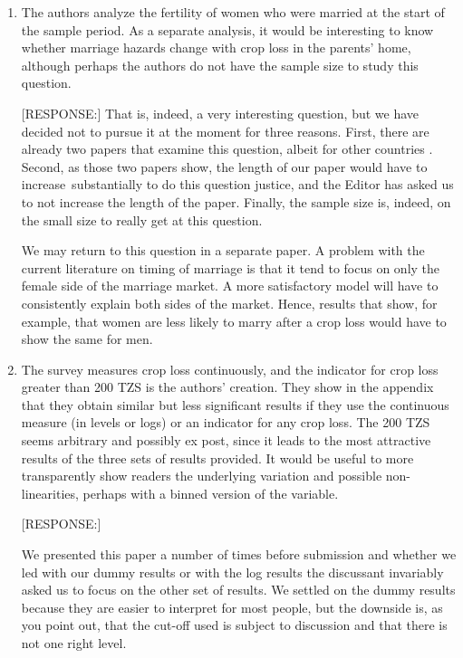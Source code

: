 \documentclass[letterpaper,12pt]{article}
\begin{document}
\begin{enumerate}
\item The authors analyze the fertility of women who were married at the
start of the sample period. As a separate analysis, it would be
interesting to know whether marriage hazards change with crop loss in
the parents' home, although perhaps the authors do not have the sample
size to study this question.

[RESPONSE:] That is, indeed, a very interesting question, but we have 
decided not to pursue it at the moment for three reasons.
First, there are already two papers that examine this question, 
albeit for other countries \citet{mbiti08,Hoogeveen2011}.
Second, as those two papers show, the length of our paper would have
to increase substantially to do this question justice, and the Editor
has asked us to not increase the length of the paper.
Finally, the sample size is, indeed, on the small size to really get 
at this question.

We may return to this question in a separate paper.
A problem with the current literature on timing of marriage
is that it tend to focus on only the female side of the marriage market.
A more satisfactory model will have to consistently explain both sides 
of the market.
Hence, results that show, for example, that women are less likely to
marry after a crop loss would have to show the same for men. 


\item The survey measures crop loss continuously, and the indicator for
crop loss greater than 200 TZS is the authors' creation. They show in
the appendix that they obtain similar but less significant results if
they use the continuous measure (in levels or logs) or an indicator for
any crop loss. The 200 TZS seems arbitrary and possibly ex post, since
it leads to the most attractive results of the three sets of results
provided. It would be useful to more transparently show readers the
underlying variation and possible non-linearities, perhaps with a binned
version of the variable.

[RESPONSE:]

We presented this paper a number of times before submission and whether 
we led with our dummy results or with the log results the discussant 
invariably asked us to focus on the other set of results.
We settled on the dummy results because they are easier to interpret 
for most people, but the downside is, as you point out, that the 
cut-off used is subject to discussion and that there is not one right level.


\end{enumerate}
\end{document}
